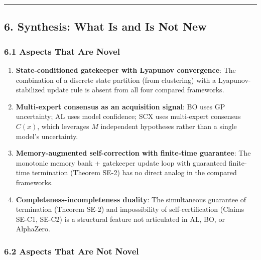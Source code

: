 \documentclass[
  12pt,
]{article}
\begin{document}
\begin{center}\rule{0.5\linewidth}{0.5pt}\end{center}

\subsection{6. Synthesis: What Is and Is Not
New}\label{synthesis-what-is-and-is-not-new}

\subsubsection{6.1 Aspects That Are Novel}\label{aspects-that-are-novel}

\begin{enumerate}
\def\labelenumi{\arabic{enumi}.}
\item
  \textbf{State-conditioned gatekeeper with Lyapunov convergence}: The
  combination of a discrete state partition (from clustering) with a
  Lyapunov-stabilized update rule is absent from all four compared
  frameworks.
\item
  \textbf{Multi-expert consensus as an acquisition signal}: BO uses GP
  uncertainty; AL uses model confidence; SCX uses multi-expert consensus
  \(C(x)\), which leverages \(M\) independent hypotheses rather than a
  single model's uncertainty.
\item
  \textbf{Memory-augmented self-correction with finite-time guarantee}:
  The monotonic memory bank + gatekeeper update loop with guaranteed
  finite-time termination (Theorem SE-2) has no direct analog in the
  compared frameworks.
\item
  \textbf{Completeness-incompleteness duality}: The simultaneous
  guarantee of termination (Theorem SE-2) and impossibility of
  self-certification (Claims SE-C1, SE-C2) is a structural feature not
  articulated in AL, BO, or AlphaZero.
\end{enumerate}

\subsubsection{6.2 Aspects That Are Not
Novel}\label{aspects-that-are-not-novel}
\end{document}
